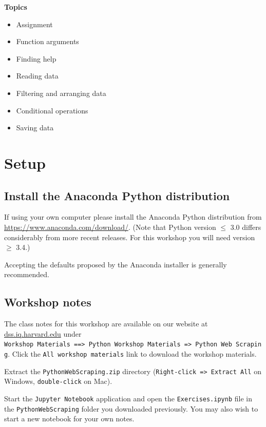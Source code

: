 \documentclass[]{book}
\providecommand{\tightlist}{%
  \setlength{\itemsep}{0pt}\setlength{\parskip}{0pt}}
\begin{document}
\textbf{Topics}

\begin{itemize}
\tightlist
\item
  Assignment
\item
  Function arguments
\item
  Finding help
\item
  Reading data
\item
  Filtering and arranging data
\item
  Conditional operations
\item
  Saving data
\end{itemize}

\section{Setup}\label{setup-5}

\subsection{Install the Anaconda Python
distribution}\label{install-the-anaconda-python-distribution-1}

If using your own computer please install the Anaconda Python
distribution from \url{https://www.anaconda.com/download/}. (Note that
Python version \(\leq\) 3.0 differs considerably from more recent
releases. For this workshop you will need version \(\geq\) 3.4.)

Accepting the defaults proposed by the Anaconda installer is generally
recommended.

\subsection{Workshop notes}\label{workshop-notes}

The class notes for this workshop are available on our website at
\href{https://dss.iq.harvard.edu}{dss.iq.harvard.edu} under
\texttt{Workshop\ Materials\ ==\textgreater{}\ Python\ Workshop\ Materials\ =\textgreater{}\ Python\ Web\ Scraping}.
Click the \texttt{All\ workshop\ materials} link to download the
workshop materials.

Extract the \texttt{PythonWebScraping.zip} directory
(\texttt{Right-click\ =\textgreater{}\ Extract\ All} on Windows,
\texttt{double-click} on Mac).

Start the \texttt{Jupyter\ Notebook} application and open the
\texttt{Exercises.ipynb} file in the \texttt{PythonWebScraping} folder
you downloaded previously. You may also wish to start a new notebook for
your own notes.
\end{document}
